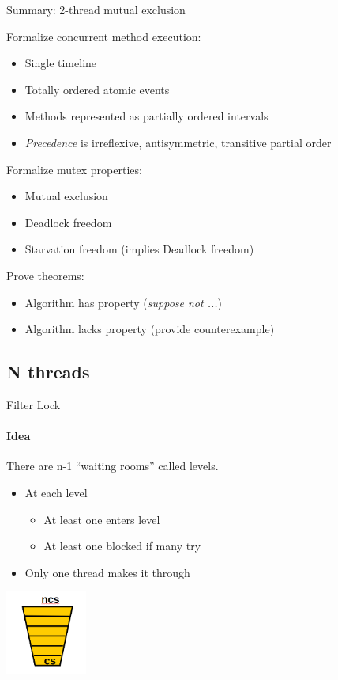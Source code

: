 \begin{frame}[fragile]{Summary: 2-thread mutual exclusion}

Formalize concurrent method execution:
\begin{itemize}
  \item Single timeline
  \item Totally ordered atomic events
  \item Methods represented as partially ordered intervals
  \item \textit{Precedence} is irreflexive, antisymmetric, transitive partial order
\end{itemize}

\pause

Formalize mutex properties:
\begin{itemize}
  \item Mutual exclusion
  \item Deadlock freedom
  \item Starvation freedom (implies Deadlock freedom)
\end{itemize}

\pause

Prove theorems:
\begin{itemize}
  \item Algorithm has property (\textit{suppose not ...})
  \item Algorithm lacks property (provide counterexample)
\end{itemize}

\end{frame}

\subsection{N threads}
\showTOCSub

\begin{frame}[fragile]{Filter Lock}
\framesubtitle{Idea}

There are n-1 “waiting rooms” called levels.

\begin{itemize}
  \item At each level
  \begin{itemize}
    \item At least one enters level
    \item At least one blocked if many try
  \end{itemize}
  \item Only one thread makes it through
\end{itemize}

\begin{center}
  \includegraphics[width=0.2\textwidth]{./pics/filter/pyramid.png}
\end{center}

\end{frame}


